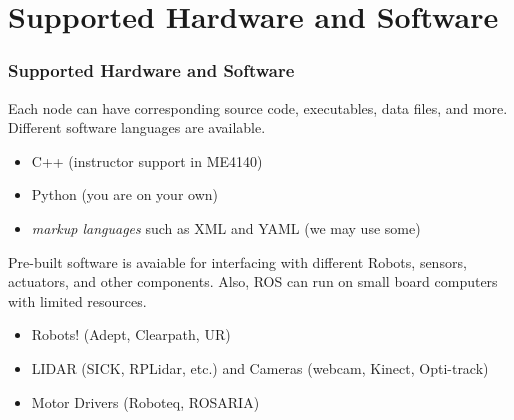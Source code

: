 \documentclass[fleqn]{beamer} %
\newcommand{\sectiontitleIV}{Supported Hardware and Software}
\begin{document}
\section{\sectiontitleIV}	
	    \begin{frame}[label=sectionIV] \small
		\frametitle{\sectiontitleIV}    
                Each node can have corresponding source code, executables, data files, and more. Different software languages are available.
                \begin{itemize}
                \item C++ (instructor support in ME4140)
                \item Python (you are on your own)
                \item {\it markup languages} such as XML and YAML (we may use some)\\
                 \end{itemize}
				
				Pre-built software is avaiable for interfacing with different Robots, sensors, actuators, and other components. Also, ROS can run on small board computers with limited resources. 
				
				\begin{itemize}
				\item Robots! (Adept, Clearpath, UR) 
				\item LIDAR (SICK, RPLidar, etc.) and Cameras (webcam, Kinect, Opti-track)

				\item Motor Drivers (Roboteq, ROSARIA) 
				\end{itemize}

		\end{frame}
		

%
\end{document}
